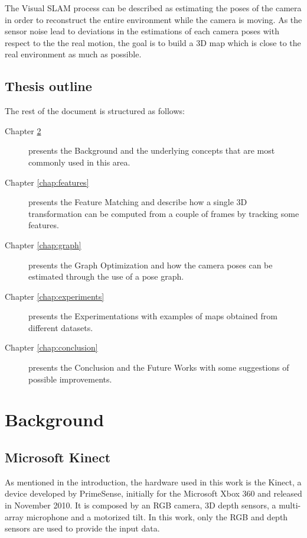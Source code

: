The Visual SLAM process can be described as estimating the poses of the camera in order to reconstruct the entire environment while the camera is moving. As the sensor noise lead to deviations in the estimations of each camera poses with respect to the the real motion, the goal is to build a 3D map which is close to the real environment as much as possible.

\section{Thesis outline}

The rest of the document is structured as follows:
\begin{description}
\item[Chapter \ref{chap:background}] presents the Background and the underlying concepts that are most commonly used in this area.
\item[Chapter \ref{chap:features}] presents the Feature Matching and describe how a single 3D transformation can be computed  from a couple of frames by tracking some features.
\item[Chapter \ref{chap:graph}] presents the Graph Optimization and how the camera poses can be estimated through the use of a pose graph.
\item[Chapter \ref{chap:experiments}] presents the Experimentations with examples of maps obtained from different datasets.
\item[Chapter \ref{chap:conclusion}] presents the Conclusion and the Future Works with some suggestions of possible improvements.
\end{description}

\chapter{Background}
\label{chap:background}

\section{Microsoft Kinect}

As mentioned in the introduction, the hardware used in this work is the Kinect, a device developed by PrimeSense, initially for the Microsoft Xbox 360 and released in November 2010. It is composed by an RGB camera, 3D depth sensors, a multi-array microphone and a motorized tilt. In this work, only the RGB and depth sensors are used to provide the input data.

